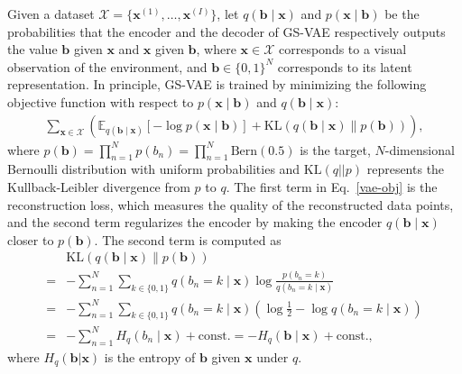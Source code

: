 Given a dataset $\mathcal{X}=\{\mathbf{x}^{(1)},\dots,\mathbf{x}^{(I)}\}$,
let $q(\mathbf{b} \mid \mathbf{x})$ and $p(\mathbf{x} \mid \mathbf{b})$ be the probabilities that the encoder and the decoder of GS-VAE respectively outputs the value $\mathbf{b}$ given $\mathbf{x}$ and $\mathbf{x}$ given $\mathbf{b}$,
where $\mathbf{x}\in \mathcal{X}$ corresponds to a visual observation of the environment, and $\mathbf{b}\in\{0,1\}^N$ corresponds to its latent representation.
In principle, GS-VAE is trained by minimizing the following objective function with respect to $p(\mathbf{x} \mid \mathbf{b})$ and $q(\mathbf{b}\mid \mathbf{x})$:
{
\begin{align}
\label{vae-obj} \sum_{\mathbf{x}\in \mathcal{X}} \left(\mathbb{E}_{q(\mathbf{b}\mid \mathbf{x})}\left[-\log p(\mathbf{x}\mid \mathbf{b})\right] + \mathrm{KL}(q(\mathbf{b}\mid \mathbf{x}) \parallel p(\mathbf{b}))\right),
\end{align}
}
where $p(\mathbf{b}) = \prod_{n=1}^N p(b_n) = \prod_{n=1}^N \mathrm{Bern}(0.5)$ is the target, $N$-dimensional Bernoulli distribution with uniform probabilities
and $\mathrm{KL}(q || p)$ represents the Kullback-Leibler divergence from $p$ to $q$.
The first term in Eq.~\eqref{vae-obj} is the reconstruction loss, which measures the quality of the reconstructed data points,
and the second term regularizes the encoder by making the encoder $q(\mathbf{b}\mid \mathbf{x})$ closer to $p(\mathbf{b})$.
The second term is computed as
{
\begin{align*}
 &{\mathrm{KL}}(q(\mathbf{b}\mid \mathbf{x}) \parallel p(\mathbf{b})) \\
= & - \sum_{n=1}^N \sum_{k\in\{0,1\}}q(b_{n}=k \mid \mathbf{x}) \log\frac{p(b_{n}=k)}{q(b_{n}=k \mid \mathbf{x})}\\
=& - \sum_{n=1}^N \sum_{k\in\{0,1\}}q(b_{n}=k \mid \mathbf{x}) \left(\log \frac{1}{2} - \log{q(b_{n}=k \mid \mathbf{x})}\right)\\
=& - \sum_{n=1}^N H_q(b_n\mid \mathbf{x}) + \mathrm{const.} = -H_q(\mathbf{b} \mid \mathbf{x}) + \mathrm{const.},
\end{align*}
}
where $H_q(\mathbf{b}|\mathbf{x})$ is the entropy of $\mathbf{b}$ given $\mathbf{x}$ under $q$.

